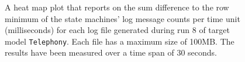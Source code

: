 \begin{figure}[htbp]
\centering
\begin{minipage}{1\textwidth}
  \centering
\end{minipage}
\caption{A heat map plot that reports on the sum difference to the row minimum of the state machines' log message counts per time unit (milliseconds) for each log file generated during run 8 of target model \texttt{Telephony}. Each file has a maximum size of 100MB. The results have been measured over a time span of 30 seconds.}
\label{figure:throughput_difference_random_det_telephony_8}
\end{figure}
